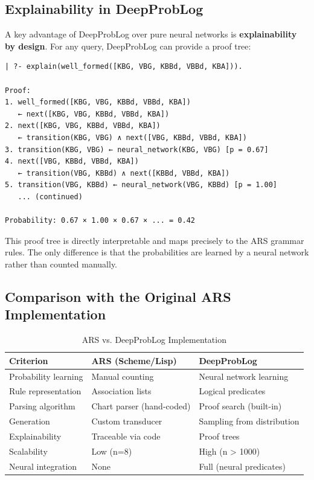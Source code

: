 \documentclass[12pt,a4paper]{article}
\begin{document}
\subsection{Explainability in DeepProbLog}

A key advantage of DeepProbLog over pure neural networks is \textbf{explainability 
by design}. For any query, DeepProbLog can provide a proof tree:

\begin{lstlisting}[caption=Explainability Output]
| ?- explain(well_formed([KBG, VBG, KBBd, VBBd, KBA])).

Proof:
1. well_formed([KBG, VBG, KBBd, VBBd, KBA])
   ← next([KBG, VBG, KBBd, VBBd, KBA])
2. next([KBG, VBG, KBBd, VBBd, KBA])
   ← transition(KBG, VBG) ∧ next([VBG, KBBd, VBBd, KBA])
3. transition(KBG, VBG) ← neural_network(KBG, VBG) [p = 0.67]
4. next([VBG, KBBd, VBBd, KBA])
   ← transition(VBG, KBBd) ∧ next([KBBd, VBBd, KBA])
5. transition(VBG, KBBd) ← neural_network(VBG, KBBd) [p = 1.00]
   ... (continued)

Probability: 0.67 × 1.00 × 0.67 × ... = 0.42
\end{lstlisting}

This proof tree is directly interpretable and maps precisely to the ARS 
grammar rules. The only difference is that the probabilities are learned 
by a neural network rather than counted manually.

\subsection{Comparison with the Original ARS Implementation}

\begin{table}[H]
\centering
\caption{ARS vs. DeepProbLog Implementation}
\label{tab:comparison}
\begin{tabular}{@{} p{4cm} p{4cm} p{4cm} @{}}
\toprule
\textbf{Criterion} & \textbf{ARS (Scheme/Lisp)} & \textbf{DeepProbLog} \\
\midrule
Probability learning & Manual counting & Neural network learning \\
Rule representation & Association lists & Logical predicates \\
Parsing algorithm & Chart parser (hand-coded) & Proof search (built-in) \\
Generation & Custom transducer & Sampling from distribution \\
Explainability & Traceable via code & Proof trees \\
Scalability & Low (n=8) & High (n > 1000) \\
Neural integration & None & Full (neural predicates) \\
\bottomrule
\end{tabular}
\end{table}
\end{document}
